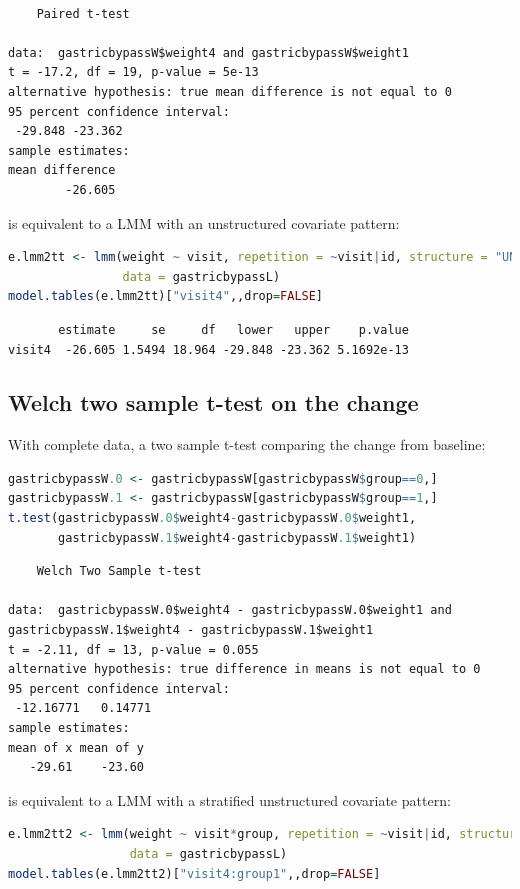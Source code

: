 \documentclass[12pt]{article}
\begin{document}
\label{}
\begin{verbatim}

	Paired t-test

data:  gastricbypassW$weight4 and gastricbypassW$weight1
t = -17.2, df = 19, p-value = 5e-13
alternative hypothesis: true mean difference is not equal to 0
95 percent confidence interval:
 -29.848 -23.362
sample estimates:
mean difference 
        -26.605
\end{verbatim}

is equivalent to a LMM with an unstructured covariate pattern:
\begin{lstlisting}[language=r,numbers=none]
e.lmm2tt <- lmm(weight ~ visit, repetition = ~visit|id, structure = "UN",
                data = gastricbypassL)
model.tables(e.lmm2tt)["visit4",,drop=FALSE]
\end{lstlisting}

\label{}
\begin{verbatim}
       estimate     se     df   lower   upper    p.value
visit4  -26.605 1.5494 18.964 -29.848 -23.362 5.1692e-13
\end{verbatim}


\clearpage
\subsection{Welch two sample t-test on the change}
\label{sec:orgacb323b}

With complete data, a two sample t-test comparing the change from baseline:
\begin{lstlisting}[language=r,numbers=none]
gastricbypassW.0 <- gastricbypassW[gastricbypassW$group==0,]
gastricbypassW.1 <- gastricbypassW[gastricbypassW$group==1,]
t.test(gastricbypassW.0$weight4-gastricbypassW.0$weight1,
       gastricbypassW.1$weight4-gastricbypassW.1$weight1)
\end{lstlisting}

\label{}
\begin{verbatim}
	Welch Two Sample t-test

data:  gastricbypassW.0$weight4 - gastricbypassW.0$weight1 and gastricbypassW.1$weight4 - gastricbypassW.1$weight1
t = -2.11, df = 13, p-value = 0.055
alternative hypothesis: true difference in means is not equal to 0
95 percent confidence interval:
 -12.16771   0.14771
sample estimates:
mean of x mean of y 
   -29.61    -23.60
\end{verbatim}

is equivalent to a LMM with a stratified unstructured covariate pattern:
\begin{lstlisting}[language=r,numbers=none]
e.lmm2tt2 <- lmm(weight ~ visit*group, repetition = ~visit|id, structure = UN(~group),
                 data = gastricbypassL)
model.tables(e.lmm2tt2)["visit4:group1",,drop=FALSE]
\end{lstlisting}
\end{document}
